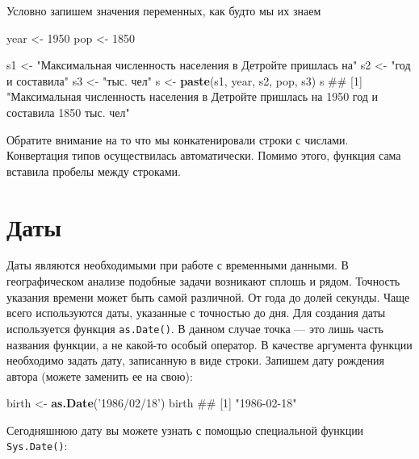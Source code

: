 \documentclass[]{book}
\newenvironment{Shaded}{\begin{snugshade}}{\end{snugshade}}
\newcommand{\KeywordTok}[1]{\textcolor[rgb]{0.13,0.29,0.53}{\textbf{#1}}}
\newcommand{\DecValTok}[1]{\textcolor[rgb]{0.00,0.00,0.81}{#1}}
\newcommand{\StringTok}[1]{\textcolor[rgb]{0.31,0.60,0.02}{#1}}
\newcommand{\NormalTok}[1]{#1}
\begin{document}
Условно запишем значения переменных, как будто мы их знаем

\begin{Shaded}
\begin{Highlighting}[]
\NormalTok{year <-}\StringTok{ }\DecValTok{1950}
\NormalTok{pop <-}\StringTok{ }\DecValTok{1850}
\end{Highlighting}
\end{Shaded}

\begin{Shaded}
\begin{Highlighting}[]
\NormalTok{s1 <-}\StringTok{ "Максимальная численность населения в Детройте пришлась на"}
\NormalTok{s2 <-}\StringTok{ "год и составила"}
\NormalTok{s3 <-}\StringTok{ "тыс. чел"}
\NormalTok{s <-}\StringTok{ }\KeywordTok{paste}\NormalTok{(s1, year, s2, pop, s3)}
\NormalTok{s}
\NormalTok{## [1] "Максимальная численность населения в Детройте пришлась на 1950 год и составила 1850 тыс. чел"}
\end{Highlighting}
\end{Shaded}

Обратите внимание на то что мы конкатенировали строки с числами.
Конвертация типов осуществилась автоматически. Помимо этого, функция
сама вставила пробелы между строками.

\section{Даты}\label{dates}

Даты являются необходимыми при работе с временными данными. В
географическом анализе подобные задачи возникают сплошь и рядом.
Точность указания времени может быть самой различной. От года до долей
секунды. Чаще всего используются даты, указанные с точностью до дня. Для
создания даты используется функция \texttt{as.Date()}. В данном случае
точка --- это лишь часть названия функции, а не какой-то особый
оператор. В качестве аргумента функции необходимо задать дату,
записанную в виде строки. Запишем дату рождения автора (можете заменить
ее на свою):

\begin{Shaded}
\begin{Highlighting}[]
\NormalTok{birth <-}\StringTok{ }\KeywordTok{as.Date}\NormalTok{(}\StringTok{'1986/02/18'}\NormalTok{)}
\NormalTok{birth}
\NormalTok{## [1] "1986-02-18"}
\end{Highlighting}
\end{Shaded}

Сегодняшнюю дату вы можете узнать с помощью специальной функции
\texttt{Sys.Date()}:
\end{document}
